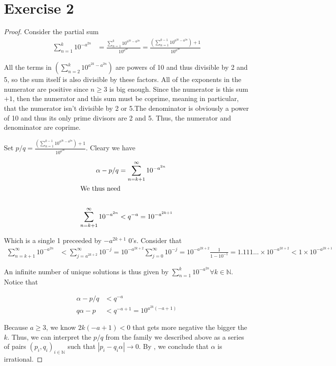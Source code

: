 \documentclass{article}
\newcommand{\N}{\mathbb{N}}
\newcommand{\abs}[1]{\left| #1 \right|}
\begin{document}
\section*{Exercise 2}
\begin{proof}

Consider the partial sum 
\begin{align*}
  \sum^k_{n=1} 10^{-a^{2n}} &= 
  \frac{\sum^k_{n=1} 10^{a^{2k} - a^{2n}}}{10^{a^{2k}}} =
  \frac{(\sum^{k - 1}_{n=1} 10^{a^{2k} - a^{2n}}) + 1}{10^{a^{2k}}}
\end{align*}

All the terms in $(\sum^k_{n=2} 10^{a^{2k} - a^{2n}})$ are powers of 10 and thus divisible by 2 and 5, so the sum itself is also divisible by these factors. All of the exponents in the numerator are positive since $n\geq 3$ is big enough. Since the numerator is this sum $+1$, then the numerator and this sum must be coprime, meaning in particular, that the numerator isn't divisible by 2 or 5.The denominator is obviously a power of 10 and thus its only prime divisors are 2 and 5. Thus, the numerator and denominator are coprime.

Set $p/q = \frac{(\sum^{k - 1}_{n=1} 10^{a^{2k} - a^{2n}}) + 1}{10^{a^{2k}}}$. Cleary we have 

\begin{align*}
  \alpha - p/q &= \sum^{\infty}_{n=k+1} 10^{-a^{2n}} \\
  \intertext{We thus need} \\
  \sum^{\infty}_{n=k+1} 10^{-a^{2n}} &< q^{-a} = 10^{-a^{2k+1}}
\end{align*}

Which is a single 1 preceeded by $-a^{2k+1}$ 0's. Consider that 
\begin{align*}
  \sum^{\infty}_{n=k+1} 10^{-a^{2n}} &< 
  \sum^{\infty}_{j=a^{2k + 2}} 10^{-j} = 10^{-a^{2k + 2}} \sum^{\infty}_{j=0} 10^{-j} = 10^{-a^{2k + 2}} \frac{1}{1 - 10^{-1}} = 1.111\dots \times 10^{-a^{2k + 2}} < 1 \times 10^{-a^{2k+1}}
\end{align*}

An infinite number of unique solutions is thus given by $\sum^k_{n=1} 10^{-a^{2n}} \forall k \in \N$. Notice that 

\begin{align*}
  \alpha - p/q &< q^{-a} \\ 
  q\alpha - p &< q^{-a + 1} = 10^{a^{2k}(-a + 1)}
\end{align*}

Because $a \geq 3$, we know $2k(-a + 1) < 0$ that gets more negative the bigger the $k$. Thus, we can interpret the $p/q$ from the family we described above as a series of pairs $(p_i, q_i)_{i\in \N}$ such that $\abs{p_i - q_i\alpha} \to 0$. By \cite[\nopp Lemma 1.9]{Everste1}, we conclude that $\alpha$ is irrational.
\end{proof}
\end{document}
